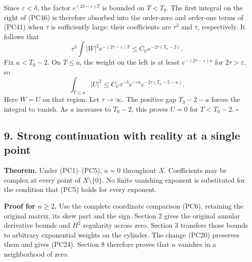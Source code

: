 \documentclass[
  11pt,
]{article}
\makeatletter
\let\ReaderOriginalAnchorStart\hyper@anchorstart
\let\ReaderOriginalAnchorEnd\hyper@anchorend
\let\ReaderPendingAliases\@empty
\def\ReaderArmAliases#1{\gdef\ReaderPendingAliases{#1}}
\def\hyper@anchorstart#1{\ReaderIfNativeAnchorTF{#1}{\ReaderPendingAliases\global\let\ReaderPendingAliases\@empty}{}\ReaderOriginalAnchorStart{#1}}
\makeatother
\begin{document}
Since \(\varepsilon<\delta\), the factor \(e^{(2\delta-\varepsilon)T}\)
is bounded on \(T<T_0\). The first integral on the right of (PC46) is
therefore absorbed into the order-zero and order-one terms of (PC41)
when \(\tau\) is sufficiently large: their coefficients are \(\tau^3\)
and \(\tau\), respectively. It follows that \[
\tau^3\int |W|^2e^{-(2\tau-\varepsilon)T}
\leq C_Ue^{-2\tau(T_0-2)}.
\tag{PC47}
\] Fix \(a<T_0-2\). On \(T\leq a\), the weight on the left is at least
\(e^{-(2\tau-\varepsilon)a}\) for \(2\tau>\varepsilon\), so \[
\int_{T\leq a}|U|^2
\leq C_U\tau^{-3}e^{-\varepsilon a}
                e^{-2\tau(T_0-2-a)}.
\tag{PC48}
\] Here \(W=U\) on that region. Let \(\tau\to\infty\). The positive gap
\(T_0-2-a\) forces the integral to vanish. As \(a\) increases to
\(T_0-2\), this proves \(U=0\) for \(T<T_0-2\). \(\square\)

\ReaderArmAliases{\ReaderOriginalAnchorStart{AN03-PCU-009}\ReaderOriginalAnchorEnd\begingroup\expandafter\def\csname @currentHref\endcsname{AN03-PCU-009}\label{AN03-PCU-009}\endgroup\ReaderOriginalAnchorStart{an03-pcu-009-strong-continuation-with-reality-at-a-single-point}\ReaderOriginalAnchorEnd\begingroup\expandafter\def\csname @currentHref\endcsname{an03-pcu-009-strong-continuation-with-reality-at-a-single-point}\label{an03-pcu-009-strong-continuation-with-reality-at-a-single-point}\endgroup\ReaderOriginalAnchorStart{9-strong-continuation-with-reality-at-a-single-point}\ReaderOriginalAnchorEnd\begingroup\expandafter\def\csname @currentHref\endcsname{9-strong-continuation-with-reality-at-a-single-point}\label{9-strong-continuation-with-reality-at-a-single-point}\endgroup\ReaderOriginalAnchorStart{strong-continuation-with-reality-at-a-single-point}\ReaderOriginalAnchorEnd}
\subsection{9. Strong continuation with reality at a single
point}\label{strong-continuation-with-reality-at-a-single-point}

\textbf{Theorem.} Under (PC1)--(PC5), \(u=0\) throughout \(X\).
Coefficients may be complex at every point of \(X\setminus\{0\}\). No
finite vanishing exponent is substituted for the condition that (PC5)
holds for every exponent.

\textbf{Proof for \(n\geq2\).} Use the complete coordinate comparison
(PC6), retaining the original matrix, its skew part and the sign.
Section 2 gives the original annular derivative bounds and \(H^2\)
regularity across zero. Section 3 transfers those bounds to arbitrary
exponential weights on the cylinder. The change (PC20) preserves them
and gives (PC24). Section 8 therefore proves that \(u\) vanishes in a
neighborhood of zero.
\end{document}
